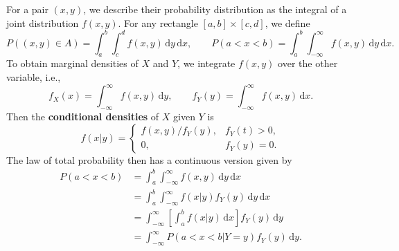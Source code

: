 \documentclass[letter-paper]{tufte-book}
\newcommand\Def[1]{\textbf{#1}}
\begin{document}
For a pair $(x,y)$, we describe their probability distribution as the integral
of a joint distribution $f(x,y)$. For any rectangle $[a,b]\times[c,d]$, we
define
\begin{equation*}
  P((x,y)\in A) = \int_a^b \int_c^d f(x,y)\, \mathrm{d}y\, \mathrm{d}x,\qquad
  P(a<x<b) = \int_a^b \int_{-\infty}^\infty f(x,y)\, \mathrm{d}y\, \mathrm{d}x.
\end{equation*}
To obtain marginal densities of $X$ and $Y$, we integrate $f(x,y)$ over the
other variable, i.e.,
\begin{equation*}
  f_X(x) = \int_{-\infty}^\infty f(x,y)\, \mathrm{d}y,\qquad
  f_Y(y) = \int_{-\infty}^\infty f(x,y)\, \mathrm{d}x.
\end{equation*}
Then the \Def{conditional densities} of $X$ given $Y$ is
\begin{equation*}
  f(x|y) =
  \begin{cases}
    f(x,y) / f_Y(y), & f_Y(t) > 0,\\
    0, & f_Y(y) = 0.
  \end{cases}
\end{equation*}
The law of total probability then has a continuous version given by
\begin{equation*}\begin{aligned}
  P(a<x<b) 
    &= \int_a^b \int_{-\infty}^\infty f(x,y)\, \mathrm{d}y\, \mathrm{d}x\\
    &= \int_a^b \int_{-\infty}^\infty f(x|y) f_Y(y)\, \mathrm{d}y\, \mathrm{d}x\\
    &= \int_{-\infty}^\infty \left[ \int_a^b f(x|y)\, \mathrm{d}x \right]
      f_Y(y)\, \mathrm{d}y\\
    &= \int_{-\infty}^\infty P(a<x<b|Y=y) f_Y(y)\, \mathrm{d}y.
\end{aligned}\end{equation*}
\end{document}
